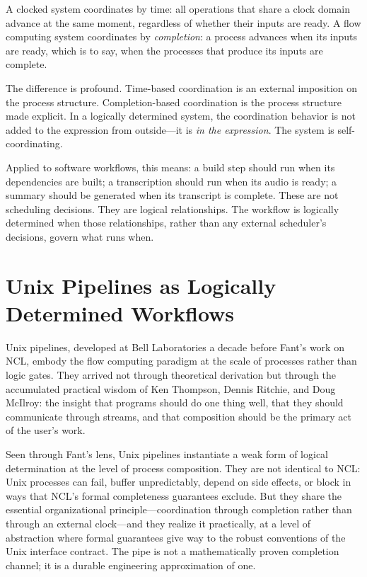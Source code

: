 \documentclass[12pt, a4paper]{article}
\begin{document}
A clocked system coordinates by time: all operations that share a
clock domain advance at the same moment, regardless of whether their
inputs are ready. A flow computing system coordinates by
\emph{completion}: a process advances when its inputs are ready,
which is to say, when the processes that produce its inputs are
complete.

The difference is profound. Time-based coordination is an external
imposition on the process structure. Completion-based coordination
is the process structure made explicit. In a logically determined
system, the coordination behavior is not added to the expression from
outside---it is \emph{in the expression}. The system is self-
coordinating.

Applied to software workflows, this means: a build step should run
when its dependencies are built; a transcription should run when its
audio is ready; a summary should be generated when its transcript is
complete. These are not scheduling decisions. They are logical
relationships. The workflow is logically determined when those
relationships, rather than any external scheduler's decisions, govern
what runs when.

\section{Unix Pipelines as Logically Determined Workflows}

Unix pipelines, developed at Bell Laboratories a decade before Fant's
work on NCL, embody the flow computing paradigm at the scale of
processes rather than logic gates. They arrived not through theoretical
derivation but through the accumulated practical wisdom of Ken Thompson,
Dennis Ritchie, and Doug McIlroy: the insight that programs should do
one thing well, that they should communicate through streams, and that
composition should be the primary act of the user's work.

Seen through Fant's lens, Unix pipelines instantiate a weak form of
logical determination at the level of process composition. They are not
identical to NCL: Unix processes can fail, buffer unpredictably, depend
on side effects, or block in ways that NCL's formal completeness
guarantees exclude. But they share the essential organizational
principle---coordination through completion rather than through an
external clock---and they realize it practically, at a level of
abstraction where formal guarantees give way to the robust conventions
of the Unix interface contract. The pipe is not a mathematically proven
completion channel; it is a durable engineering approximation of one.
\end{document}
